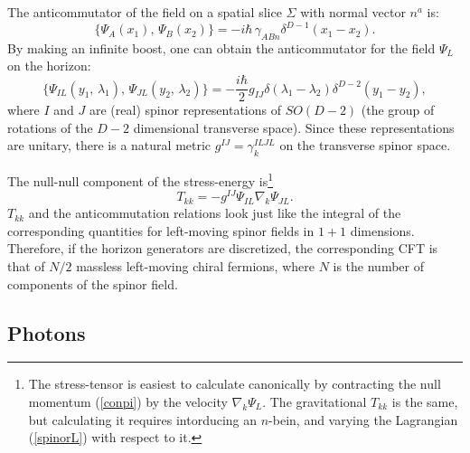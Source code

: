 \documentclass{article}
\begin{document}
The anticommutator of the field on a spatial slice $\Sigma$ with normal vector $n^a$ is:
\begin{equation}
\{ \Psi_A(x_1) ,\, \Psi_B(x_2) \} = -i\hbar\,\gamma_{ABn} \delta^{D-1}(x_1 - x_2).
\end{equation}
By making an infinite boost, one can obtain the anticommutator for the field $\Psi_L$ on the horizon:
\begin{equation}
\{ \Psi_{IL}(y_1,\,\lambda_1) ,\, \Psi_{JL}(y_2,\,\lambda_2) \} =
-\frac{i\hbar}{2} g_{IJ} \delta(\lambda_1 - \lambda_2) \delta^{D-2}(y_1 - y_2),
\end{equation}
where $I$ and $J$ are (real) spinor representations of $SO(D - 2)$ (the group of rotations of the $D - 2$ dimensional transverse space).  Since these representations are unitary, there is a natural metric $g^{IJ} = \gamma^{ILJL}_k$ on the transverse spinor space.

The null-null component of the stress-energy is\footnote{The stress-tensor is easiest to calculate canonically by contracting the null momentum (\ref{conpi}) by the velocity $\nabla_k \Psi_L$.  The gravitational $T_{kk}$ is the same, but calculating it requires intorducing an $n$-bein, and varying the Lagrangian (\ref{spinorL}) with respect to it.}
\begin{equation}
T_{kk} = -g^{IJ} \Psi_{IL} \nabla_k \Psi_{JL}.
\end{equation}
$T_{kk}$ and the anticommutation relations look just like the integral of the corresponding quantities for left-moving spinor fields in $1+1$ dimensions.  Therefore, if the horizon generators are discretized, the corresponding CFT is that of $N/2$ massless left-moving chiral fermions, where $N$ is the number of components of the spinor field.

\subsection{Photons}\label{phot}
\end{document}
